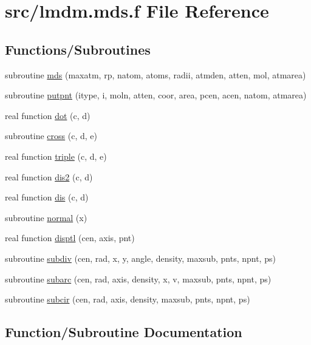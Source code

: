 \hypertarget{lmdm_8mds_8f}{}\section{src/lmdm.mds.\+f File Reference}
\label{lmdm_8mds_8f}
\subsection*{Functions/\+Subroutines}
\begin{DoxyCompactItemize}
\item 
subroutine \hyperlink{lmdm_8mds_8f_aa81f9e2405716814317f319fe16aabf3}{mds} (maxatm, rp, natom, atoms, radii, atmden, atten, mol, atmarea)
\item 
subroutine \hyperlink{lmdm_8mds_8f_abe5d23f06aa6cacf4afa05316bab2b62}{putpnt} (itype, i, moln, atten, coor, area, pcen, acen, natom, atmarea)
\item 
real function \hyperlink{lmdm_8mds_8f_ae601373f8acae350412756b81d7274c6}{dot} (c, d)
\item 
subroutine \hyperlink{lmdm_8mds_8f_ac8fc253e71c54239b8fdeca12294dc5c}{cross} (c, d, e)
\item 
real function \hyperlink{lmdm_8mds_8f_a4f0dc28bb4bc5945b250816796a6393c}{triple} (c, d, e)
\item 
real function \hyperlink{lmdm_8mds_8f_a0bbe4edf805497daf7eb55647f0e5463}{dis2} (c, d)
\item 
real function \hyperlink{lmdm_8mds_8f_a01231839cc4a4124a635ad9d120126a6}{dis} (c, d)
\item 
subroutine \hyperlink{lmdm_8mds_8f_a104a2973a06ccc713e06d9f6cb97874e}{normal} (x)
\item 
real function \hyperlink{lmdm_8mds_8f_a4e9fa2843ce6a1ff87a65c5b8e014c60}{disptl} (cen, axis, pnt)
\item 
subroutine \hyperlink{lmdm_8mds_8f_aede2b2a740b771fe587f556209c97414}{subdiv} (cen, rad, x, y, angle, density, maxsub, pnts,                   npnt, ps)
\item 
subroutine \hyperlink{lmdm_8mds_8f_ad6dfe437b099fa551d05e784b5c7afcd}{subarc} (cen, rad, axis, density, x, v, maxsub, pnts,                   npnt, ps)
\item 
subroutine \hyperlink{lmdm_8mds_8f_a4957fbd7ab497fae37c246c1ae6d6f86}{subcir} (cen, rad, axis, density, maxsub, pnts, npnt,                   ps)
\end{DoxyCompactItemize}


\subsection{Function/\+Subroutine Documentation}
\hypertarget{lmdm_8mds_8f_ac8fc253e71c54239b8fdeca12294dc5c}{}
